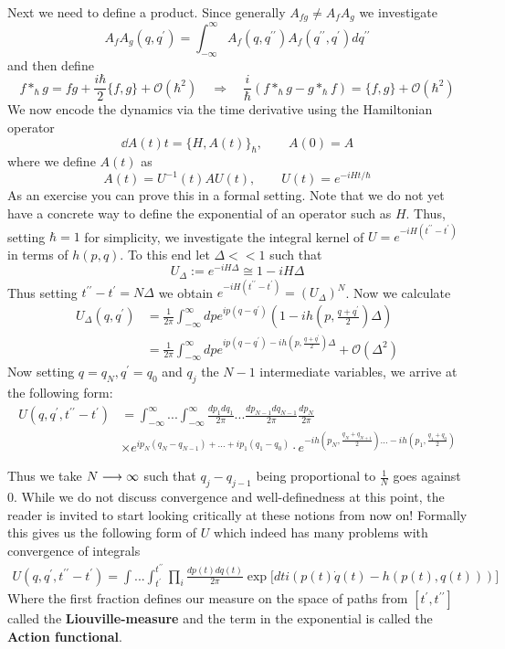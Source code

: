 \begin{example}
  Next we need to define a product. Since generally $A_{fg} \neq A_f A_g$ we investigate
  $$ A_f A_g (q, q^\prime) = \int_{-\infty}^\infty A_f(q, q^{\prime \prime}) A_f(q^{\prime \prime},q^\prime) dq^{\prime \prime} $$
  and then define
  $$ f *_\hbar g = fg + \frac{i\hbar}{2} \{f,g\} + \mathcal{O}(\hbar^2) \quad \Rightarrow \quad \frac{i}{\hbar} (f *_\hbar g - g *_\hbar f) = \{f,g\} + \mathcal{O}(\hbar^2)$$
  We now encode the dynamics via the time derivative using the Hamiltonian operator
  $$ \dd{A(t)}{t} = \{H, A(t)\}_\hbar , \quad \quad A(0) = A $$
  where we define $A(t)$ as
  $$ A(t) = U^{-1}(t) A U(t), \quad \quad U(t) = e^{-i H t / \hbar} $$
  As an exercise you can prove this in a formal setting. Note that we do not yet have a concrete way to define the exponential of an operator such as $H$. Thus, setting $\hbar = 1$ for simplicity, we investigate the integral kernel of $U = e^{-iH(t^{\prime \prime} - t^\prime)}$ in terms of $h(p,q)$. To this end let $\Delta << 1$ such that
  $$ U_\Delta := e^{-i H \Delta} \cong 1- i H \Delta $$
  Thus setting $t^{\prime \prime} - t^\prime = N \Delta$ we obtain $e^{-iH(t^{\prime \prime} - t^\prime)} = (U_\Delta)^N$. Now we calculate
  \begin{align*}
    U_\Delta(q,q^\prime) &= \frac{1}{2\pi} \int_{-\infty}^\infty dp e^{ip(q-q^\prime)} \left( 1- i h\left(p, \frac{q+q^\prime}{2} \right) \Delta \right) \\
    &= \frac{1}{2\pi} \int_{-\infty}^\infty dp e^{ip(q-q^\prime) - i h\left(p, \frac{q+q^\prime}{2} \right) \Delta} + \mathcal{O}(\Delta^2)
  \end{align*}
  Now setting $q = q_N, q^\prime = q_0$ and $q_j$ the $N-1$ intermediate variables, we arrive at the following form:
  \begin{align*}
    U(q, q^\prime, t^{\prime\prime}-t^\prime) &= \int_{-\infty}^\infty ... \int_{-\infty}^\infty \frac{dp_1 dq_1}{2\pi} ... \frac{dp_{N-1} dq_{N-1}}{2\pi} \frac{dp_N}{2\pi}\\
    &\times e^{ip_{N}(q_{N}-q_{N-1}) + ... + ip_1(q_1-q_0)} \cdot e^{-ih\left(p_N, \frac{q_N + q_{N+1}}{2}\right) ... -ih\left( p_1, \frac{q_1 + q_0}{2} \right)}
  \end{align*}

  Thus we take $N\longrightarrow \infty$ such that $q_j - q_{j-1}$ being proportional to $\frac{1}{N}$ goes against $0$. While we do not discuss convergence and well-definedness at this point, the reader is invited to start looking critically at these notions from now on! Formally this gives us the following form of $U$ which indeed has many problems with convergence of integrals
  \begin{align*}
    U(q,q^\prime, t^{\prime\prime}-t^\prime) = \int ... \int_{t^\prime}^{t^{\prime\prime}} \prod_i \frac{dp(t) dq(t)}{2\pi} \exp\Big[dt i ( p(t)\dot q(t) - h(p(t),q(t)))\Big]
  \end{align*}
  Where the first fraction defines our measure on the space of paths from $[t^\prime, t^{\prime\prime}]$ called the \textbf{Liouville-measure} and the term in the exponential is called the \textbf{Action functional}.\\


\end{example}
